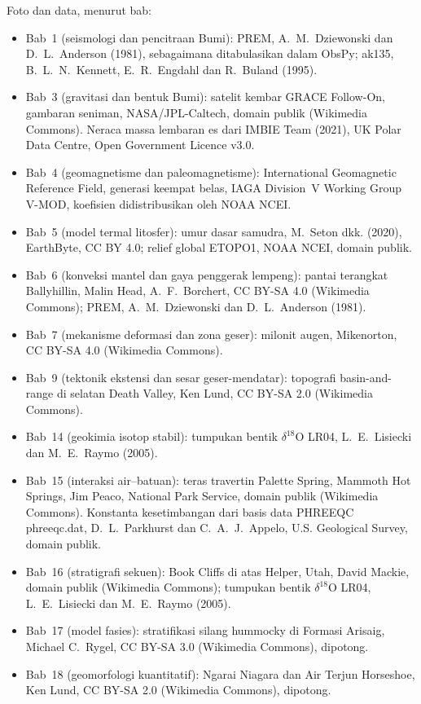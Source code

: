 \bigskip
\noindent Foto dan data, menurut bab:
\begin{itemize}\small
  \item Bab~1 (seismologi dan pencitraan Bumi): PREM, A.~M.~Dziewonski dan D.~L.~Anderson (1981), sebagaimana ditabulasikan dalam ObsPy; ak135, B.~L.~N.~Kennett, E.~R.~Engdahl dan R.~Buland (1995).
  \item Bab~3 (gravitasi dan bentuk Bumi): satelit kembar GRACE Follow-On, gambaran seniman, NASA/JPL-Caltech, domain publik (Wikimedia Commons). Neraca massa lembaran es dari IMBIE Team (2021), UK Polar Data Centre, Open Government Licence v3.0.
  \item Bab~4 (geomagnetisme dan paleomagnetisme): International Geomagnetic Reference Field, generasi keempat belas, IAGA Division~V Working Group V-MOD, koefisien didistribusikan oleh NOAA NCEI.
  \item Bab~5 (model termal litosfer): umur dasar samudra, M.~Seton dkk. (2020), EarthByte, CC BY 4.0; relief global ETOPO1, NOAA NCEI, domain publik.
  \item Bab~6 (konveksi mantel dan gaya penggerak lempeng): pantai terangkat Ballyhillin, Malin Head, A.~F.~Borchert, CC BY-SA 4.0 (Wikimedia Commons); PREM, A.~M.~Dziewonski dan D.~L.~Anderson (1981).
  \item Bab~7 (mekanisme deformasi dan zona geser): milonit augen, Mikenorton, CC BY-SA 4.0 (Wikimedia Commons).
  \item Bab~9 (tektonik ekstensi dan sesar geser-mendatar): topografi basin-and-range di selatan Death Valley, Ken Lund, CC BY-SA 2.0 (Wikimedia Commons).
  \item Bab~14 (geokimia isotop stabil): tumpukan bentik $\delta^{18}$O LR04, L.~E.~Lisiecki dan M.~E.~Raymo (2005).
  \item Bab~15 (interaksi air--batuan): teras travertin Palette Spring, Mammoth Hot Springs, Jim Peaco, National Park Service, domain publik (Wikimedia Commons). Konstanta kesetimbangan dari basis data PHREEQC phreeqc.dat, D.~L.~Parkhurst dan C.~A.~J.~Appelo, U.S. Geological Survey, domain publik.
  \item Bab~16 (stratigrafi sekuen): Book Cliffs di atas Helper, Utah, David Mackie, domain publik (Wikimedia Commons); tumpukan bentik $\delta^{18}$O LR04, L.~E.~Lisiecki dan M.~E.~Raymo (2005).
  \item Bab~17 (model fasies): stratifikasi silang hummocky di Formasi Arisaig, Michael C.~Rygel, CC BY-SA 3.0 (Wikimedia Commons), dipotong.
  \item Bab~18 (geomorfologi kuantitatif): Ngarai Niagara dan Air Terjun Horseshoe, Ken Lund, CC BY-SA 2.0 (Wikimedia Commons), dipotong.

\end{itemize}
